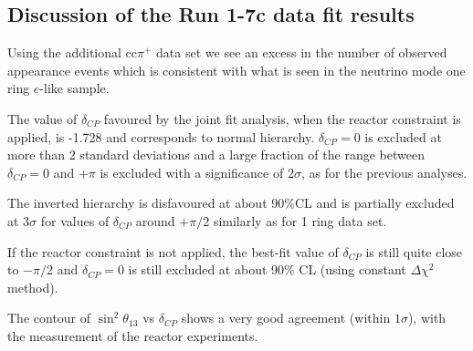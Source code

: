 \subsection {Discussion of the Run 1-7c data fit results}
\label{sec:results_discussion_run17c}

Using the additional cc$\pi^+$ data set we see an excess in the number of observed appearance 
events which is consistent with what is seen in the neutrino mode one ring $e$-like sample. 

The value of $\delta_{CP}$ favoured by the joint fit analysis, when the reactor constraint is applied, 
is -1.728 and corresponds to normal hierarchy.
$\delta_{CP} = 0$ is excluded at more than 2 standard deviations and a large fraction of the range between $\delta_{CP} = 0$ and $+\pi$
is excluded with a significance of $2 \sigma$, as for the previous analyses.

The inverted hierarchy is disfavoured at about 90\%CL and is partially 
excluded at $3\sigma$ for values of $\delta_{CP}$ around $+\pi/2$ similarly as for 1 ring data set.

If the reactor constraint is not applied, the best-fit value of $\delta_{CP}$ is still quite close to $-\pi/2$
and $\delta_{CP}=0$ is still excluded at about 90\% CL (using constant $\Delta \chi^2$ method).

The contour of $\sin^2 \theta_{13}$ vs $\delta_{CP}$ shows a very good agreement (within $1 \sigma$),
with the measurement of the reactor experiments.


\clearpage




